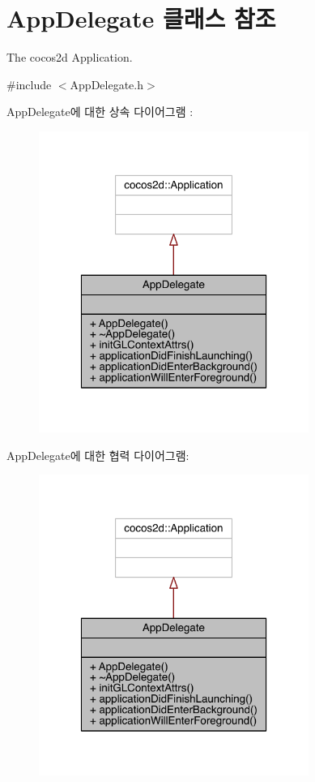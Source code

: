 \hypertarget{class_app_delegate}{}\section{App\+Delegate 클래스 참조}
\label{class_app_delegate}


The cocos2d Application.  




{\ttfamily \#include $<$App\+Delegate.\+h$>$}



App\+Delegate에 대한 상속 다이어그램 \+: 
\nopagebreak
\begin{figure}[H]
\begin{center}
\leavevmode
\includegraphics[width=250pt]{d0/d1d/class_app_delegate__inherit__graph}
\end{center}
\end{figure}


App\+Delegate에 대한 협력 다이어그램\+:
\nopagebreak
\begin{figure}[H]
\begin{center}
\leavevmode
\includegraphics[width=250pt]{d3/db4/class_app_delegate__coll__graph}
\end{center}
\end{figure}
